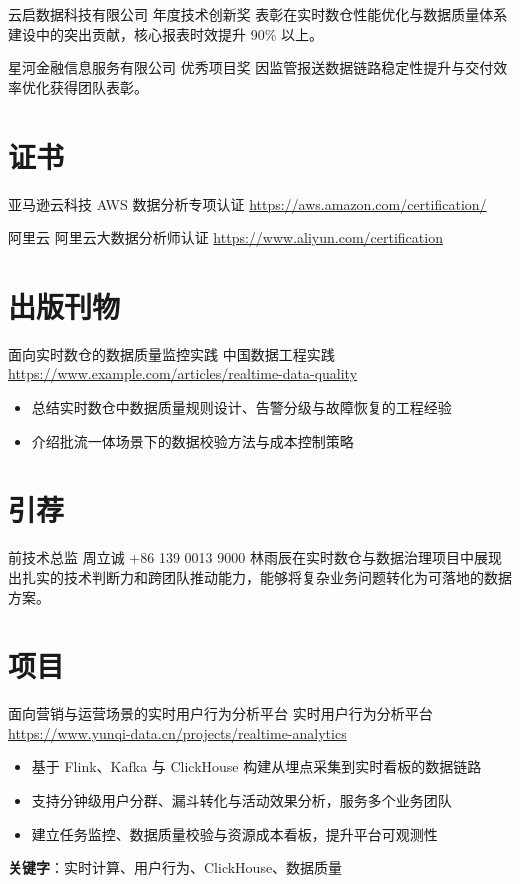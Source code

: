 \documentclass[a4paper, serif, 10pt]{moderncv}
\begin{document}
        {云启数据科技有限公司}
        {年度技术创新奖}
        {}
        {}
        {表彰在实时数仓性能优化与数据质量体系建设中的突出贡献，核心报表时效提升 90\% 以上。}

        {星河金融信息服务有限公司}
        {优秀项目奖}
        {}
        {}
        {因监管报送数据链路稳定性提升与交付效率优化获得团队表彰。}
\section{证书}

        {亚马逊云科技}
        {AWS 数据分析专项认证}
        {\url{https://aws.amazon.com/certification/}}
        {}
        {}

        {阿里云}
        {阿里云大数据分析师认证}
        {\url{https://www.aliyun.com/certification}}
        {}
        {}
\section{出版刊物}

        {面向实时数仓的数据质量监控实践}
        {中国数据工程实践}
        {\url{https://www.example.com/articles/realtime-data-quality}}
        {}
        {\begin{itemize}
\item 总结实时数仓中数据质量规则设计、告警分级与故障恢复的工程经验
\item 介绍批流一体场景下的数据校验方法与成本控制策略
\end{itemize}}
\section{引荐}

        {前技术总监}
        {周立诚}
        {+86 139 0013 9000}
        {}
        {林雨辰在实时数仓与数据治理项目中展现出扎实的技术判断力和跨团队推动能力，能够将复杂业务问题转化为可落地的数据方案。}
\section{项目}

        {面向营销与运营场景的实时用户行为分析平台}
        {实时用户行为分析平台}
        {\url{https://www.yunqi-data.cn/projects/realtime-analytics}}
        {}
        {\begin{itemize}
\item 基于 Flink、Kafka 与 ClickHouse 构建从埋点采集到实时看板的数据链路
\item 支持分钟级用户分群、漏斗转化与活动效果分析，服务多个业务团队
\item 建立任务监控、数据质量校验与资源成本看板，提升平台可观测性
\end{itemize}
\textbf{关键字}：实时计算、用户行为、ClickHouse、数据质量}
\end{document}
